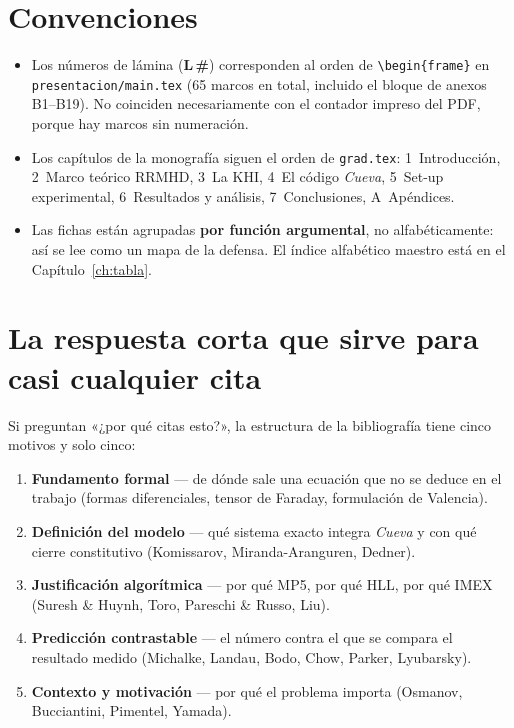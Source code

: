 \documentclass[11pt,openany]{report}
\begin{document}
\section{Convenciones}

\begin{itemize}
  \item Los números de lámina (\textbf{L\,\#}) corresponden al orden de
        \verb|\begin{frame}| en \texttt{presentacion/main.tex}
        (65 marcos en total, incluido el bloque de anexos B1--B19).
        No coinciden necesariamente con el contador impreso del PDF,
        porque hay marcos sin numeración.
  \item Los capítulos de la monografía siguen el orden de
        \texttt{grad.tex}: 1~Introducción, 2~Marco teórico RRMHD,
        3~La KHI, 4~El código \textit{Cueva}, 5~Set-up experimental,
        6~Resultados y análisis, 7~Conclusiones, A~Apéndices.
  \item Las fichas están agrupadas \textbf{por función argumental}, no
        alfabéticamente: así se lee como un mapa de la defensa. El
        índice alfabético maestro está en el Capítulo~\ref{ch:tabla}.
\end{itemize}

\section{La respuesta corta que sirve para casi cualquier cita}

Si preguntan «¿por qué citas esto?», la estructura de la bibliografía
tiene cinco motivos y solo cinco:

\begin{enumerate}
  \item \textbf{Fundamento formal} --- de dónde sale una ecuación que
        no se deduce en el trabajo (formas diferenciales, tensor de
        Faraday, formulación de Valencia).
  \item \textbf{Definición del modelo} --- qué sistema exacto integra
        \textit{Cueva} y con qué cierre constitutivo (Komissarov,
        Miranda-Aranguren, Dedner).
  \item \textbf{Justificación algorítmica} --- por qué MP5, por qué
        HLL, por qué IMEX (Suresh \& Huynh, Toro, Pareschi \& Russo,
        Liu).
  \item \textbf{Predicción contrastable} --- el número contra el que se
        compara el resultado medido (Michalke, Landau, Bodo, Chow,
        Parker, Lyubarsky).
  \item \textbf{Contexto y motivación} --- por qué el problema importa
        (Osmanov, Bucciantini, Pimentel, Yamada).
\end{enumerate}
\end{document}
